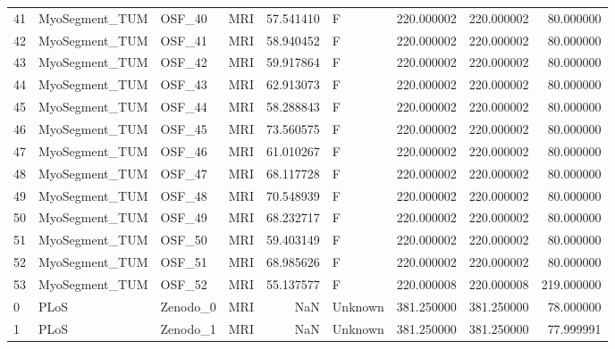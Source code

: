 \begin{tabular}{llllrlrrr}
41     &  MyoSegment\_TUM &       OSF\_40 &                MRI &  57.541410 &        F &       220.000002 &    220.000002 &   80.000000 \\
42     &  MyoSegment\_TUM &       OSF\_41 &                MRI &  58.940452 &        F &       220.000002 &    220.000002 &   80.000000 \\
43     &  MyoSegment\_TUM &       OSF\_42 &                MRI &  59.917864 &        F &       220.000002 &    220.000002 &   80.000000 \\
44     &  MyoSegment\_TUM &       OSF\_43 &                MRI &  62.913073 &        F &       220.000002 &    220.000002 &   80.000000 \\
45     &  MyoSegment\_TUM &       OSF\_44 &                MRI &  58.288843 &        F &       220.000002 &    220.000002 &   80.000000 \\
46     &  MyoSegment\_TUM &       OSF\_45 &                MRI &  73.560575 &        F &       220.000002 &    220.000002 &   80.000000 \\
47     &  MyoSegment\_TUM &       OSF\_46 &                MRI &  61.010267 &        F &       220.000002 &    220.000002 &   80.000000 \\
48     &  MyoSegment\_TUM &       OSF\_47 &                MRI &  68.117728 &        F &       220.000002 &    220.000002 &   80.000000 \\
49     &  MyoSegment\_TUM &       OSF\_48 &                MRI &  70.548939 &        F &       220.000002 &    220.000002 &   80.000000 \\
50     &  MyoSegment\_TUM &       OSF\_49 &                MRI &  68.232717 &        F &       220.000002 &    220.000002 &   80.000000 \\
51     &  MyoSegment\_TUM &       OSF\_50 &                MRI &  59.403149 &        F &       220.000002 &    220.000002 &   80.000000 \\
52     &  MyoSegment\_TUM &       OSF\_51 &                MRI &  68.985626 &        F &       220.000002 &    220.000002 &   80.000000 \\
53     &  MyoSegment\_TUM &       OSF\_52 &                MRI &  55.137577 &        F &       220.000008 &    220.000008 &  219.000000 \\
0      &            PLoS &     Zenodo\_0 &                MRI &        NaN &  Unknown &       381.250000 &    381.250000 &   78.000000 \\
1      &            PLoS &     Zenodo\_1 &                MRI &        NaN &  Unknown &       381.250000 &    381.250000 &   77.999991 \\

\end{tabular}
